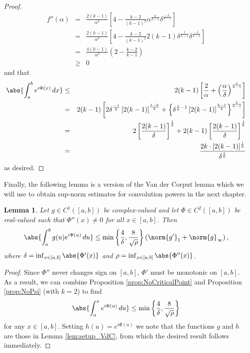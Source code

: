 \documentclass[11pt, letter]{book}
\newtheorem{lemma}[theorem]{Lemma}
\newcommand{\lp}{\left(}
\newcommand{\rp}{\right)}
\newcommand{\lb}{\left[}
\newcommand{\rb}{\right]}
\newcommand{\lc}{\left\{}
\newcommand{\rc}{\right\}}
\newcommand{\f}[2]{\frac{#1}{#2}}
\newcommand{\al}{\alpha}
\begin{document}
\begin{proof}
\begin{eqnarray*}
    f''(\al) 
    &=&  \frac{2 (k-1)
   }{\alpha ^3} \left[4-\frac{ k-2}{(
   k-1)^2} \alpha^{\f{k}{k-1}} \delta^{\frac{-1}{k-1}} \right]\\
   &=& \frac{2 (k-1)
   }{\alpha ^3} \left[4-\frac{ k-2}{(
   k-1)^2}  2(k-1) \delta^{\f{1}{k-1}} \delta^{\frac{-1}{k-1}} \right]\\
   &=& \frac{4 (k-1)
   }{\alpha ^3} \left(2-\frac{ k-2}{
   k-1}  \right)\\
   &\geq& 0
\end{eqnarray*}
and that
\begin{eqnarray*}
    \abs{\int_a^b e^{i \Phi(x)} \,dx}  
    &\leq& 2(k-1)\lb \f{2}{ \alpha} +\lp  \f{\al}{\delta}\rp^{\f{1}{k-1}}   \rb\\
    &=&  2(k-1)\lb 2\delta^{\f{-1}{k}}\lb 2(k-1) \rb^{\f{1-k}{k}} +  \lc \delta^{\f{1}{k}-1} \lb 2(k-1) \rb^{\f{k-1}{k}} \rc^{\f{1}{k-1}}\rb \\
    &=& 2\lb \f{2(k-1)}{\delta} \rb^{\f{1}{k}} + 2(k-1)\lb \f{2(k-1)}{\delta}\rb^{\f{1}{k}} \\
    &=& \f{2k\cdot [2(k-1)]^{\f{1}{k}}}{\delta^{\f{1}{k}}}
\end{eqnarray*}
as desired. 
\end{proof}

\noindent Finally, the following lemma is a version of the Van der Corput lemma which we will use to obtain sup-norm estimates for convolution powers in the next chapter.

\begin{framed}
\begin{lemma}\label{lem:VdC}
Let $g\in C^1([a,b])$ be complex-valued and let $\Phi\in C^2([a,b])$ be real-valued such that $\Phi''(x) \neq 0$ for all $x\in [a,b]$. Then
\begin{equation*}
    \abs{\int^b_a g(u) e^{i\Phi(u)}\,du} \leq \min \lc \f{4}{\delta}, \f{8}{\sqrt{\rho}}  \rc \lp \norm{g'}_1 + \norm{g}_\infty \rp,
\end{equation*}
where $\delta = \inf_{x\in [a,b]} \abs{\Phi'(x)}$ and $\rho = \inf_{x\in [a,b]} \abs{\Phi''(x)}$. 
\end{lemma}
\end{framed}
\begin{proof}
Since $\Phi''$ never changes sign on $[a,b]$, $\Phi'$ must be monotonic on $[a,b]$. As a result, we can combine Proposition \ref{prop:NoCriticalPoint} and Proposition \ref{prop:NoPsi} (with $k=2$) to find
\begin{equation*}
    \abs{\int^x_a e^{i\Phi(u)}\,du} \leq \min \lc \f{4}{\delta}, \f{8}{\sqrt{\rho}} \rc
\end{equation*}
for any $x\in [a,b]$. Setting $h(u) = e^{i\Phi(u)}$ we note that the functions $g$ and $h$ are those in Lemma \ref{lem:setup_VdC}, from which the desired result follows immediately. 
\end{proof}
\end{document}
